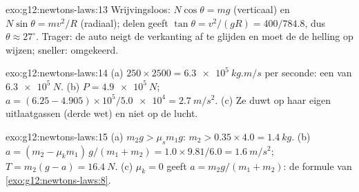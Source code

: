 \begin{solution}{exo:g12:newtons-laws:13}
Wrijvingsloos: $N\cos\theta = mg$ (verticaal) en $N\sin\theta = mv^2/R$
(radiaal); delen geeft $\tan\theta = v^2/(gR) = 400/784.8$, dus
$\theta \approx 27^\circ$. Trager: de auto neigt de verkanting af te
glijden en moet de  de helling op wijzen; sneller: omgekeerd.
\end{solution}

\begin{solution}{exo:g12:newtons-laws:14}
(a) $250 \times 2500 = \qty{6.3e5}{kg.m/s}$ per seconde: een 
van $\qty{6.3e5}{N}$. (b) $P = \qty{4.9e5}{N}$;
$a = (6.25 - 4.905) \times 10^5 / \num{5.0e4} = \qty{2.7}{m/s^2}$.
(c) Ze duwt op haar eigen uitlaatgassen (derde wet) en niet op de lucht.
\end{solution}

\begin{solution}{exo:g12:newtons-laws:15}
(a) $m_2 g > \mu_s m_1 g$: $m_2 > 0.35 \times 4.0 = \qty{1.4}{kg}$.
(b) $a = (m_2 - \mu_k m_1)\,g/(m_1 + m_2) = 1.0 \times 9.81/6.0 =
\qty{1.6}{m/s^2}$; $T = m_2(g - a) = \qty{16.4}{N}$. (c) $\mu_k = 0$
geeft $a = m_2 g/(m_1 + m_2)$: de formule van
\cref{exo:g12:newtons-laws:8}.
\end{solution}


